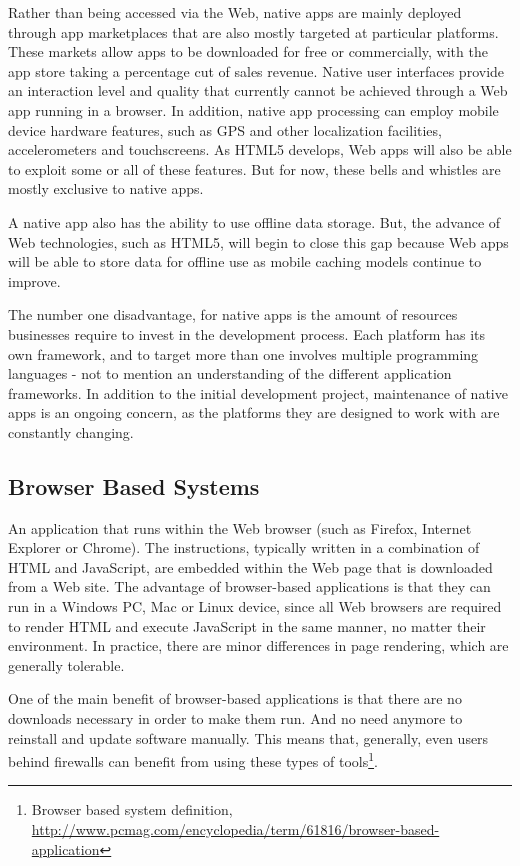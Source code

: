 	Rather than being accessed via the Web, native apps are mainly deployed through app marketplaces that are also mostly targeted at particular platforms. These markets allow apps to be downloaded for free or commercially, with the app store taking a percentage cut of sales revenue. Native user interfaces provide an interaction level and quality that currently cannot be achieved through a Web app running in a browser. In addition, native app processing can employ mobile device hardware features, such as GPS and other localization facilities, accelerometers and touchscreens. As HTML5 develops, Web apps will also be able to exploit some or all of these features. But for now, these bells and whistles are mostly exclusive to native apps.

A native app also has the ability to use offline data storage. But, the advance of Web technologies, such as HTML5, will begin to close this gap because Web apps will be able to store data for offline use as mobile caching models continue to improve.

The number one disadvantage, for native apps is the amount of resources businesses require to invest in the development process. Each platform has its own framework, and to target more than one involves multiple programming languages - not to mention an understanding of the different application frameworks. In addition to the initial development project, maintenance of native apps is an ongoing concern, as the platforms they are designed to work with are constantly changing.

\subsection{Browser Based Systems}
An application that runs within the Web browser (such as Firefox, Internet Explorer or Chrome). The instructions, typically written in a combination of HTML and JavaScript, are embedded within the Web page that is downloaded from a Web site. The advantage of browser-based applications is that they can run in a Windows PC, Mac or Linux device, since all Web browsers are required to render HTML and execute JavaScript in the same manner, no matter their environment. In practice, there are minor differences in page rendering, which are generally tolerable. 

One of the main benefit of browser-based applications is that there are no downloads necessary in order to make them run. And no need anymore to reinstall and update software manually. This means that, generally, even users behind firewalls can benefit from using these types of tools\footnote{Browser based system definition, \url{http://www.pcmag.com/encyclopedia/term/61816/browser-based-application}}.

